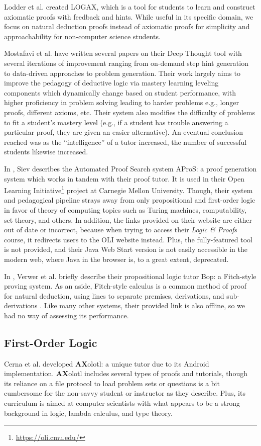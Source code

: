 \documentclass[ms]{uncgdissertationexp2}
\theoremstyle{plain}
\theoremstyle{definition}
\theoremstyle{remark}
\begin{document}
Lodder et al. \cite{lodder} created LOGAX, which is a tool for students to learn and construct axiomatic proofs with feedback and hints. While useful in its specific domain, we focus on natural deduction proofs instead of axiomatic proofs for simplicity and approachability for non-computer science students.

Mostafavi et al. \cite{mostafavi} have written several papers on their Deep Thought tool with several iterations of improvement ranging from on-demand step hint generation to data-driven approaches to problem generation. Their work largely aims to improve the pedagogy of deductive logic via mastery learning leveling components which dynamically change based on student performance, with higher proficiency in problem solving leading to harder problems e.g., longer proofs, different axioms, etc. Their system also modifies the difficulty of problems to fit a student's mastery level (e.g., if a student has trouble answering a particular proof, they are given an easier alternative). An eventual conclusion reached was as the ``intelligence'' of a tutor increased, the number of successful students likewise increased. 

In \cite{apros}, Siev describes the Automated Proof Search system AProS: a proof generation system which works in tandem with their proof tutor. It is used in their Open Learning Initiative\footnote{\url{https://oli.cmu.edu/}} project at Carnegie Mellon University. Though, their system and pedagogical pipeline strays away from only propositional and first-order logic in favor of theory of computing topics such as Turing machines, computability, set theory, and others. In addition, the links provided on their website are either out of date or incorrect, because when trying to access their \textit{Logic \& Proofs} course, it redirects users to the OLI website instead. Plus, the fully-featured tool is not provided, and their Java Web Start version is not easily accessible in the modern web, where Java in the browser is, to a great extent, deprecated.

In \cite{verwer}, Verwer et al. briefly describe their propositional logic tutor Bop: a Fitch-style proving system. As an aside, Fitch-style calculus is a common method of proof for natural deduction, using lines to separate premises, derivations, and sub-derivations \cite{fitch}. Like many other systems, their provided link is also offline, so we had no way of assessing its performance.

\subsection{First-Order Logic}
Cerna et al. \cite{cerna} developed \textbf{AX}olotl: a unique tutor due to its Android implementation. \textbf{AX}olotl includes several types of proofs and tutorials, though its reliance on a file protocol to load problem sets or questions is a bit cumbersome for the non-savvy student or instructor as they describe. Plus, its curriculum is aimed at computer scientists with what appears to be a strong background in logic, lambda calculus, and type theory.
\end{document}
